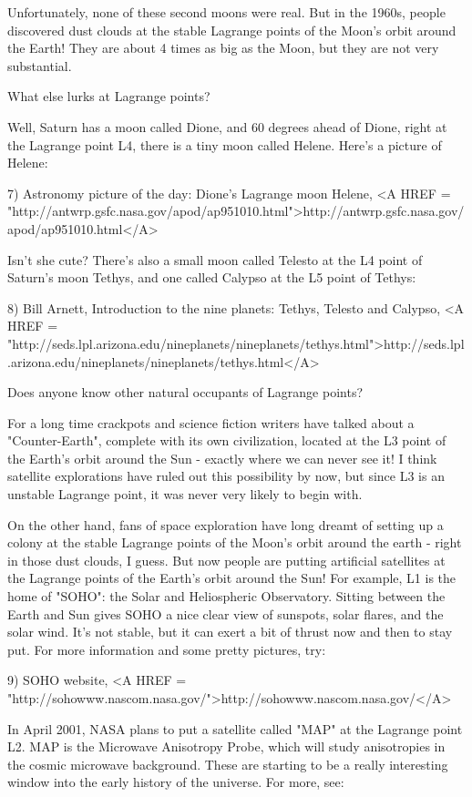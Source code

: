 Unfortunately, none of these second moons were real.  But in the 1960s,
people discovered dust clouds at the stable Lagrange points of the Moon's 
orbit around the Earth!   They are about 4 times as big as the Moon, but
they are not very substantial.    

What else lurks at Lagrange points? 

Well, Saturn has a moon called Dione, and 60 degrees ahead of Dione, 
right at the Lagrange point L4, there is a tiny moon called Helene.  
Here's a picture of Helene:

7) Astronomy picture of the day: Dione's Lagrange moon Helene, 
<A HREF = "http://antwrp.gsfc.nasa.gov/apod/ap951010.html">http://antwrp.gsfc.nasa.gov/apod/ap951010.html</A>

Isn't she cute?  There's also a small moon called Telesto at the L4 
point of Saturn's moon Tethys, and one called Calypso at the L5 point 
of Tethys:

8) Bill Arnett, Introduction to the nine planets: Tethys, Telesto and Calypso,
<A HREF = "http://seds.lpl.arizona.edu/nineplanets/nineplanets/tethys.html">http://seds.lpl.arizona.edu/nineplanets/nineplanets/tethys.html</A>

Does anyone know other natural occupants of Lagrange points?  

For a long time crackpots and science fiction writers have talked about
a "Counter-Earth", complete with its own civilization, located 
at the L3
point of the Earth's orbit around the Sun - exactly where we can never
see it!  I think satellite explorations have ruled out this possibility
by now, but since L3 is an unstable Lagrange point, it was never very
likely to begin with.   

On the other hand, fans of space exploration have long dreamt of 
setting up a colony at the stable Lagrange points of the Moon's 
orbit around the earth - right in those dust clouds, I guess.   
But now people are putting artificial satellites at the Lagrange 
points of the Earth's orbit around the Sun!  For example, L1 is 
the home of "SOHO": the Solar and Heliospheric Observatory.  Sitting 
between the Earth and Sun gives SOHO a nice clear view of sunspots, 
solar flares, and the solar wind.  It's not stable, but it can exert 
a bit of thrust now and then to stay put.  For more information and 
some pretty pictures, try:

9) SOHO website, <A HREF = "http://sohowww.nascom.nasa.gov/">http://sohowww.nascom.nasa.gov/</A>

In April 2001, NASA plans to put a satellite called "MAP" at the
Lagrange point L2.  MAP is the Microwave Anisotropy Probe, which will 
study anisotropies in the cosmic microwave background.  These are
starting to be a really interesting window into the early history of
the universe.  For more, see:

